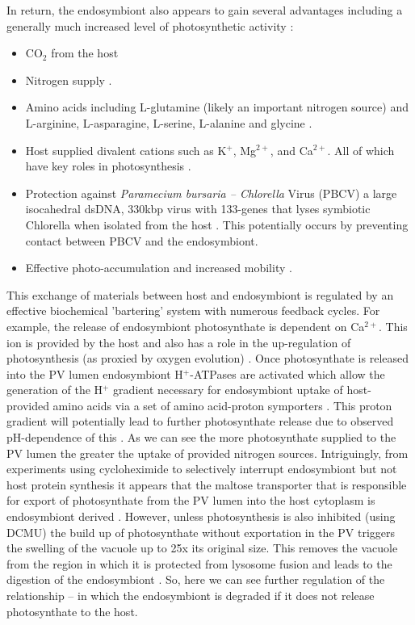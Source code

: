 In return, the endosymbiont also appears to gain several advantages including a generally much increased level of photosynthetic activity \citep{Sommaruga2009}:
\begin{itemize}
    \item CO$_{2}$ from the host \citep{Parker1927}
    \item Nitrogen supply \citep{Johnson2011}.
    \item Amino acids including L-glutamine (likely an important nitrogen source) \citep{Reisser1992} and L-arginine, L-asparagine, L-serine, L-alanine and glycine \citep{Kato2009}.
    \item Host supplied divalent cations such as K$^{+}$, Mg$^{2+}$, and Ca$^{2+}$. All of which have key roles in photosynthesis \citep{Kato2009}.
    \item Protection against \textit{Paramecium bursaria – Chlorella} Virus (PBCV) \citep{Yaschenko2011} a large isocahedral dsDNA, 330kbp virus with 133-genes that lyses symbiotic Chlorella when isolated from the host \citep{vanEtten1982}.  This potentially occurs by preventing contact between PBCV and the endosymbiont.
    \item Effective photo-accumulation and increased mobility \citep{Neiss1982}.
\end{itemize}
%
This exchange of materials between host and endosymbiont is regulated by an effective biochemical 'bartering' system with numerous feedback cycles. 
For example, the release of endosymbiont photosynthate is dependent on Ca$^{2+}$.  
This ion is provided by the host and also has a role in the up-regulation of photosynthesis (as proxied by oxygen evolution) \citep{Kato2009}.     
Once photosynthate is released into the PV lumen endosymbiont H$^{+}$-ATPases are activated which allow the generation of the H$^{+}$ gradient necessary for endosymbiont uptake of host-provided amino acids via a set of amino acid-proton symporters \citep{Camoni2006}.
This proton gradient will potentially lead to further photosynthate release due to observed pH-dependence of this \citep{Kato2009}. 
As we can see the more photosynthate supplied to the PV lumen the greater the uptake of provided nitrogen sources.  
Intriguingly, from experiments using cycloheximide to selectively interrupt endosymbiont but not host protein synthesis it appears that the maltose transporter that is responsible for export of photosynthate from the PV lumen into the host cytoplasm is endosymbiont derived \citep{Muscataine1967}. 
However, unless photosynthesis is also inhibited (using DCMU) the build up of photosynthate without exportation in the PV triggers the swelling of the vacuole up to 25x its original size.  
This removes the vacuole from the region in which it is protected from lysosome fusion and leads to the digestion of the endosymbiont \citep{Kodama2009}.
So, here we can see further regulation of the relationship – in which the endosymbiont is degraded if it does not release photosynthate to the host.

